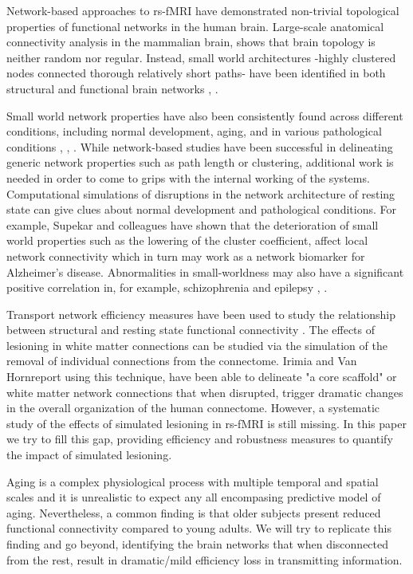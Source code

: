 \documentclass[12pt,a4paper]{article}
\begin{document}
Network-based approaches to rs-fMRI have demonstrated
non-trivial topological properties of functional networks in the human brain.
Large-scale anatomical
connectivity analysis in the mammalian brain, shows that brain topology is
neither random nor regular. Instead, small world
architectures -highly clustered nodes connected thorough
relatively short paths- have been identified in both structural and functional brain networks  \cite{Watts:1998}, \cite{Bassett:2006}.

Small world network properties have also been consistently found across different
conditions, including normal development, aging, and
in various pathological conditions \cite{wang_graph-based_2010}, \cite{anderson_decreased_2013}, \cite{stam_modern_2014}. 
While network-based studies have been successful in delineating generic network properties such as
path length or clustering, additional work is needed in order to come to grips
with the internal working of the systems.
Computational simulations of disruptions in the network
architecture of resting state can give clues about
normal development and pathological conditions. For example, Supekar and
colleagues \cite{Supekar:2008} have shown that the deterioration of small world
properties such as the lowering of the cluster coefficient, affect local
network connectivity which in turn may work as a network biomarker for
Alzheimer's disease. Abnormalities in small-worldness may also have a
significant positive correlation in, for example, schizophrenia
\cite{liu_disrupted_2008} and epilepsy \cite{liao_altered_2010}, \cite{zhang_altered_2011}.

Transport network efficiency measures have been used to study the relationship between structural and resting state functional connectivity \cite{goni_resting-brain_2014}. 
The effects of lesioning in white matter connections can be studied via the simulation of the removal of individual connections from the connectome. Irimia and Van Hornreport \cite{irimia_systematic_2014} using this technique, have been able to delineate "a core scaffold" or white matter network connections that when disrupted, trigger dramatic changes in the overall organization of the human connectome. However, a systematic study of the effects of simulated lesioning in rs-fMRI is still missing. 
In this paper we try to fill this gap, providing efficiency and robustness measures to quantify the impact of simulated lesioning.

Aging is a complex physiological process with multiple temporal and spatial scales and it is unrealistic to expect any all encompasing predictive model of aging. Nevertheless, a common finding is that older subjects present reduced functional connectivity compared to young adults. We will try to replicate this finding and go beyond, identifying the brain networks that when disconnected from the rest, result in dramatic/mild efficiency loss in transmitting information. 
\end{document}

